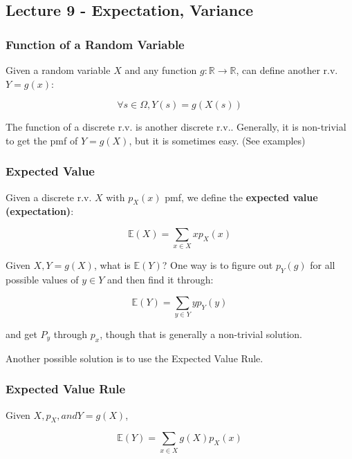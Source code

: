 \documentclass{article}
\begin{document}
\medskip\hline
\subsection{Lecture 9 - Expectation, Variance}

\subsubsection{Function of a Random Variable}

Given a random variable $X$ and any function $g : \mathbb{R}
\rightarrow \mathbb{R}$, can define another r.v. $Y = g(x)$:

\[
  \forall s \in \Omega, Y(s) = g(X(s))
\]

The function of a discrete r.v. is another discrete r.v.. Generally,
it is non-trivial to get the pmf of $Y=g(X)$, but it is sometimes
easy. (See examples)

\subsubsection{Expected Value}

Given a discrete r.v. $X$ with $p_X(x)$ pmf, we define the
\textbf{expected value (expectation)}:

\begin{equation}
  \tag{Expected Value Definition}
  \boxed{
    \mathbb{E}(X) = \sum\limits_{x \in X} x p_X(x)
  }
\end{equation}

Given $X, Y = g(X)$, what is $\mathbb{E}(Y)$? One way is to figure out
$p_Y(g)$ for all possible values of $y \in Y$ and then find it
through:

\[
  \mathbb{E}(Y) = \sum\limits_{y \in Y} y p_Y(y)
\]

and get $P_y$ through $p_x$, though that is generally a non-trivial
solution.

Another possible solution is to use the Expected Value Rule.

\subsubsection{Expected Value Rule}

Given $X, p_X, and Y=g(X)$,

\begin{equation}
  \tag{Expected Value Rule}
  \boxed{
    \mathbb{E}(Y) = \sum\limits_{x \in X} g(X) p_X(x)
  }
\end{equation}
\end{document}

